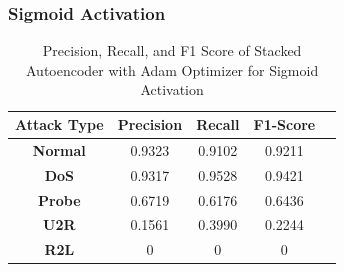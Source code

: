 \documentclass[12pt, a4paper]{report}
\begin{document}
\subsubsection{Sigmoid Activation}
\begin{table}[ht]
\centering
\captionsetup{justification=centering,margin=2cm}
\begin{tabular}{|c|c|c|c|c|}
\hline
\multicolumn{1}{|c|}{\textbf{Attack Type}} & \multicolumn{1}{c|}{\textbf{Precision}} & \multicolumn{1}{c|}{\textbf{Recall}} & \multicolumn{1}{c|}{\textbf{F1-Score}} \\ \hline
\textbf{Normal}        & 0.9323                                  & 0.9102                               & 0.9211                                                                  \\ \hline
\textbf{DoS}           & 0.9317                                  & 0.9528                                &  0.9421                                                                   \\ \hline
\textbf{Probe}         & 0.6719                                  & 0.6176                                & 0.6436                                                                  \\ \hline
\textbf{U2R}           & 0.1561                                   & 0.3990                                & 0.2244                                                                     \\ \hline
\textbf{R2L}           & 0                                       & 0                                    & 0                                                                          \\ \hline
\end{tabular}
\caption{Precision, Recall, and F1 Score of Stacked Autoencoder with Adam Optimizer for Sigmoid Activation}
\label{prf1_adam_sigmoid_auto}
\end{table}
\end{document}
